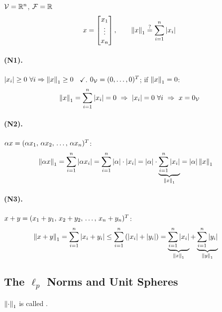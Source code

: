 \begin{example}
$\V=\R^n$, $\F=\R$
\[
x = \bmat{x_1\\\vdots\\x_n}, \qquad \norm{x}_1 \overset{?}{=} \sum_{i=1}^{n}\abs{x_i}
\]
\paragraph{(N1).} $\abs{x_i}\ge0\ \forall i \Rightarrow \norm{x}_1\ge0$ \ $\checkmark$. \quad $0_{\V} = (0,\dots,0)\T$; if $\norm{x}_1=0$:
\[
\norm{x}_1 = \sum_{i=1}^{n}\abs{x_i} = 0
\ \Rightarrow\ \abs{x_i}=0 \ \forall i
\ \Rightarrow\ x=0_{\V}
\]
\paragraph{(N2).} $\alpha x = (\alpha x_1,\, \alpha x_2,\, \dots,\, \alpha x_n)\T$:
\begin{align*}
\norm{\alpha x}_1 &= \sum_{i=1}^{n}\abs{\alpha x_i} = \sum_{i=1}^{n}\abs{\alpha}\cdot\abs{x_i}
= \abs{\alpha}\cdot\underbrace{\sum_{i=1}^{n}\abs{x_i}}_{\norm{x}_1} = \abs{\alpha}\norm{x}_1
\end{align*}

\paragraph{(N3).} $x+y = (x_1+y_1,\, x_2+y_2,\, \dots,\, x_n+y_n)\T$:
\begin{align*}
\norm{x+y}_1 = \sum_{i=1}^{n}\abs{x_i+y_i} &\le \sum_{i=1}^{n}\left(\abs{x_i}+\abs{y_i}\right)
= \underbrace{\sum_{i=1}^{n}\abs{x_i}}_{\norm{x}_1}+\underbrace{\sum_{i=1}^{n}\abs{y_i}}_{\norm{y}_1}
\end{align*}
\end{example}

\subsection{The $\ell_p$ Norms and Unit Spheres}\label{ss:lp}
\point $\norm{\cdot}_1$ is called .

